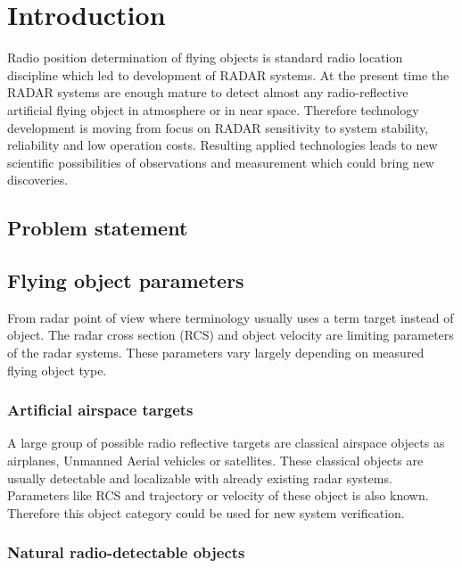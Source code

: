 \documentclass[twoside]{ctuthesis}
\theoremstyle{plain}
\theoremstyle{definition}
\theoremstyle{note}
\begin{document}
\maketitle

\chapter{Introduction}

Radio position determination of flying objects is standard radio location discipline which led to development of RADAR systems. At the present time the RADAR systems are enough mature to detect almost any radio-reflective artificial flying object in atmosphere or in near space. Therefore technology development is moving from focus on RADAR sensitivity to system stability, reliability and low operation costs. Resulting applied technologies leads to new scientific possibilities of observations and measurement which could bring new discoveries. 

\section{Problem statement}

\section{Flying object parameters}

From radar point of view where terminology usually uses a term target instead of object. The radar cross section (RCS) and object velocity are limiting parameters of the radar systems. These parameters vary largely depending on measured flying object type. 

\subsection{Artificial airspace targets}

A large group of possible radio reflective targets are classical airspace objects as airplanes, Unmanned Aerial vehicles or satellites. These classical objects are usually detectable and localizable with already existing radar systems. Parameters like RCS and trajectory or velocity of these object is also known. Therefore this object category could be used for new system verification. 

\subsection{Natural radio-detectable objects}
\end{document}
